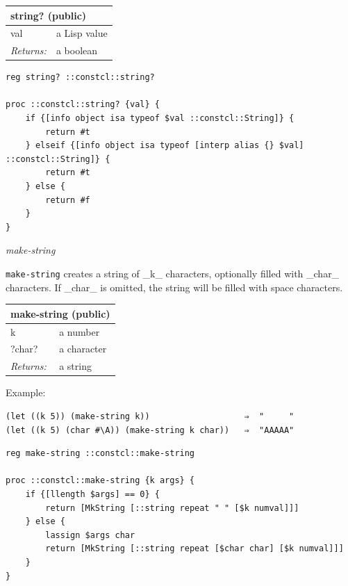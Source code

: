 \documentclass[twoside,9pt]{report}
\begin{document}
\noindent\makebox[\linewidth]{\rule{\linewidth}{0.4pt}}
\begin{tabular}{ |l l| }
\hline
\multicolumn{2}{|l|}{string? (public)} \\
\hline
val & a Lisp value \\
\textit{Returns:} & a boolean \\
\hline
\end{tabular}

\noindent\makebox[\linewidth]{\rule{\linewidth}{0.4pt}}
\begin{lstlisting}
reg string? ::constcl::string?
 
proc ::constcl::string? {val} {
    if {[info object isa typeof $val ::constcl::String]} {
        return #t
    } elseif {[info object isa typeof [interp alias {} $val] ::constcl::String]} {
        return #t
    } else {
        return #f
    }
}
\end{lstlisting}
\noindent\makebox[\linewidth]{\rule{\linewidth}{0.4pt}}

\emph{make-string}


\texttt{make-string} creates a string of \_k\_ characters, optionally filled with \_char\_ characters. If \_char\_ is omitted, the string will be filled with space characters.

\begin{tabular}{ |l l| }
\hline
\multicolumn{2}{|l|}{make-string (public)} \\
\hline
k & a number \\
?char? & a character \\
\textit{Returns:} & a string \\
\hline
\end{tabular}


Example:

\noindent\makebox[\linewidth]{\rule{\linewidth}{0.4pt}}
\begin{lstlisting}
(let ((k 5)) (make-string k))                   ⇒  "     "
(let ((k 5) (char #\A)) (make-string k char))   ⇒  "AAAAA"
\end{lstlisting}
\noindent\makebox[\linewidth]{\rule{\linewidth}{0.4pt}}
\noindent\makebox[\linewidth]{\rule{\linewidth}{0.4pt}}
\begin{lstlisting}
reg make-string ::constcl::make-string
 
proc ::constcl::make-string {k args} {
    if {[llength $args] == 0} {
        return [MkString [::string repeat " " [$k numval]]]
    } else {
        lassign $args char
        return [MkString [::string repeat [$char char] [$k numval]]]
    }
}
\end{lstlisting}
\noindent\makebox[\linewidth]{\rule{\linewidth}{0.4pt}}
\end{document}
